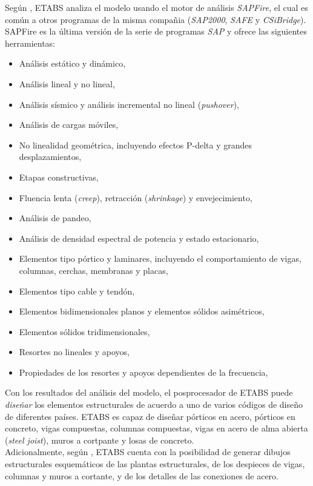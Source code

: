 Según \cite{ETABS2017analysisreferencemanual}, ETABS analiza el modelo usando el motor de análisis \emph{SAPFire}, el cual es común a otros programas de la misma compañia (\emph{SAP2000}, \emph{SAFE} y \emph{CSiBridge}). SAPFire es la última versión de la serie de programas \emph{SAP} y ofrece las siguientes herramientas:
\begin{itemize}
    \item Análisis estático y dinámico,
    \item Análisis lineal y no lineal,
    \item Análisis sísmico y análisis incremental no lineal (\emph{pushover}),
    \item Análisis de cargas móviles,
    \item No linealidad geométrica, incluyendo efectos P-delta y grandes desplazamientos,
    \item Etapas constructivas,
    \item Fluencia lenta (\emph{creep}), retracción (\emph{shrinkage}) y envejecimiento,
    \item Análisis de pandeo,
    \item Análisis de densidad espectral de potencia y estado estacionario,
    \item Elementos tipo pórtico y laminares, incluyendo el comportamiento de vigas, columnas, cerchas, membranas y placas,
    \item Elementos tipo cable y tendón,
    \item Elementos bidimensionales planos y elementos sólidos asimétricos,
    \item Elementos sólidos tridimensionales,
    \item Resortes no lineales y apoyos,
    \item Propiedades de los resortes y apoyos dependientes de la frecuencia,
\end{itemize}

Con los resultados del análisis del modelo, el posprocesador de ETABS puede \emph{diseñar} los elementos estructurales de acuerdo a uno de varios códigos de diseño de diferentes países. ETABS es capaz de diseñar pórticos en acero, pórticos en concreto, vigas compuestas, columnas compuestas, vigas en acero de alma abierta (\emph{steel joist}), muros a cortpante y losas de concreto.\\

Adicionalmente, según \cite{ETABS2019welcome}, ETABS cuenta con la posibilidad de generar dibujos estructurales esquemáticos de las plantas estructurales, de los despieces de vigas, columnas y muros a cortante, y de los detalles de las conexiones de acero.\\

